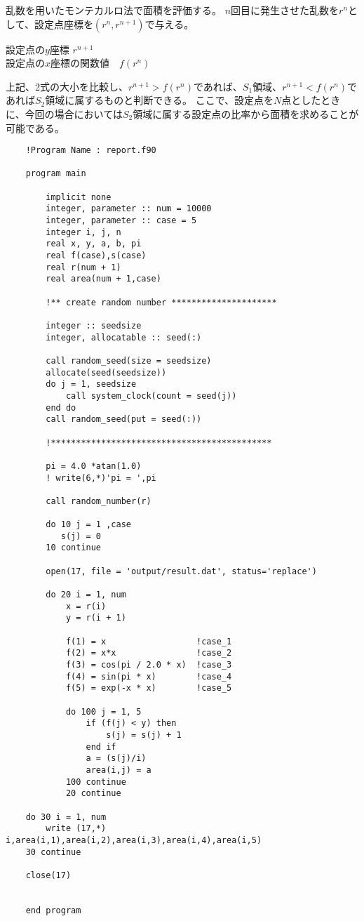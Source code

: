 \documentclass[12pt,a4paper]{jsarticle}
\begin{document}
乱数を用いたモンテカルロ法で面積を評価する。
$n$回目に発生させた乱数を$r^n$として、設定点座標を$\left(r^n, r^{n+1}\right)$で与える。\\
\begin{center}
    設定点の$y$座標          $r^{n+1}$\\
    設定点の$x$座標の関数値　$f\left(r^n\right)$
\end{center}
上記、2式の大小を比較し、$r^{n+1}>f(r^n)$であれば、$S_1$領域、$r^{n+1}<f(r^n)$であれば$S_2$領域に属するものと判断できる。
ここで、設定点を$N$点としたときに、今回の場合においては$S_2$領域に属する設定点の比率から面積を求めることが可能である。\\
\newpage
\small
\begin{lstlisting}
    !Program Name : report.f90

    program main
    
        implicit none
        integer, parameter :: num = 10000
        integer, parameter :: case = 5
        integer i, j, n
        real x, y, a, b, pi
        real f(case),s(case)
        real r(num + 1)
        real area(num + 1,case)
    
        !** create random number *********************
        
        integer :: seedsize
        integer, allocatable :: seed(:)
        
        call random_seed(size = seedsize)       
        allocate(seed(seedsize))               
        do j = 1, seedsize
            call system_clock(count = seed(j)) 
        end do
        call random_seed(put = seed(:))         
        
        !********************************************
    
        pi = 4.0 *atan(1.0)
        ! write(6,*)'pi = ',pi
    
        call random_number(r)
    
        do 10 j = 1 ,case
           s(j) = 0
        10 continue
    
        open(17, file = 'output/result.dat', status='replace')
    
        do 20 i = 1, num
            x = r(i)
            y = r(i + 1)
        
            f(1) = x                  !case_1
            f(2) = x*x                !case_2
            f(3) = cos(pi / 2.0 * x)  !case_3
            f(4) = sin(pi * x)        !case_4
            f(5) = exp(-x * x)        !case_5
    
            do 100 j = 1, 5   
                if (f(j) < y) then
                    s(j) = s(j) + 1
                end if    
                a = (s(j)/i)
                area(i,j) = a
            100 continue
            20 continue
    
    do 30 i = 1, num
        write (17,*) i,area(i,1),area(i,2),area(i,3),area(i,4),area(i,5)
    30 continue
    
    close(17)
    
    
    end program
\end{lstlisting}
\end{document}
